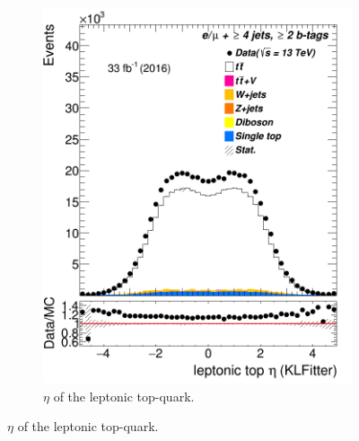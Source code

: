 \begin{figure}
\begin{subfigure}{0.25\textwidth}
	\includegraphics[width=\linewidth]{ControlPlots_emujets_2016_4incl_2incl/klf_topLep_eta_emujets_2016.png}
	\caption{$\eta$ of the leptonic top-quark.} \label{fig:K14}
\end{subfigure}



	
	

\end{figure}
